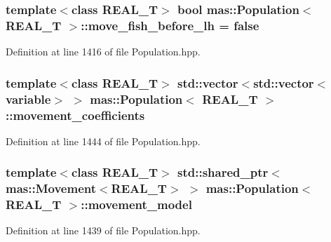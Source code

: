 \hypertarget{classmas_1_1_population_a94c79dddb366eb6702f4a2cfd77c3eb8}{
\subsubsection[{move\-\_\-fish\-\_\-before\-\_\-lh}]{\setlength{\rightskip}{0pt plus 5cm}template$<$class R\-E\-A\-L\-\_\-\-T$>$ bool {\bf mas\-::\-Population}$<$ R\-E\-A\-L\-\_\-\-T $>$\-::move\-\_\-fish\-\_\-before\-\_\-lh = false}}\label{classmas_1_1_population_a94c79dddb366eb6702f4a2cfd77c3eb8}


Definition at line 1416 of file Population.\-hpp.

\hypertarget{classmas_1_1_population_a99d5b7c5e089b8313abaffe5491848bc}{
\subsubsection[{movement\-\_\-coefficients}]{\setlength{\rightskip}{0pt plus 5cm}template$<$class R\-E\-A\-L\-\_\-\-T$>$ std\-::vector$<$std\-::vector$<${\bf variable}$>$ $>$ {\bf mas\-::\-Population}$<$ R\-E\-A\-L\-\_\-\-T $>$\-::movement\-\_\-coefficients}}\label{classmas_1_1_population_a99d5b7c5e089b8313abaffe5491848bc}


Definition at line 1444 of file Population.\-hpp.

\hypertarget{classmas_1_1_population_a8452be41c1534e55f5c8169655f8f6c3}{
\subsubsection[{movement\-\_\-model}]{\setlength{\rightskip}{0pt plus 5cm}template$<$class R\-E\-A\-L\-\_\-\-T$>$ std\-::shared\-\_\-ptr$<${\bf mas\-::\-Movement}$<$R\-E\-A\-L\-\_\-\-T$>$ $>$ {\bf mas\-::\-Population}$<$ R\-E\-A\-L\-\_\-\-T $>$\-::movement\-\_\-model}}\label{classmas_1_1_population_a8452be41c1534e55f5c8169655f8f6c3}


Definition at line 1439 of file Population.\-hpp.

